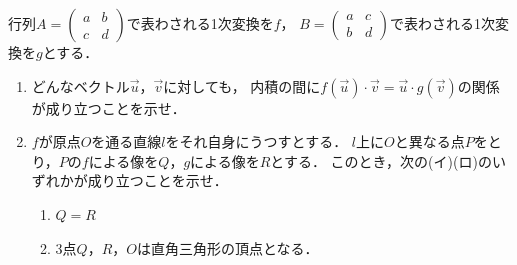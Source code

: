 \documentclass[../../main.tex]{subfiles}
\begin{document}
行列$A=
\begin{pmatrix} a & b \\ c & d
\end{pmatrix}$で表わされる1次変換を$f$，
$B=
\begin{pmatrix} a & c \\ b & d
\end{pmatrix}$で表わされる1次変換を$g$とする．
\begin{enumerate}
  \item どんなベクトル$\vec{u}$，$\vec{v}$に対しても，
    内積の間に$f(\vec{u})\cdot\vec{v}=\vec{u}\cdot g(\vec{v})$の関係が成り立つことを示せ．
  \item $f$が原点$O$を通る直線$l$をそれ自身にうつすとする．
    $l$上に$O$と異なる点$P$をとり，$P$の$f$による像を$Q$，$g$による像を$R$とする．
    このとき，次の(イ)(ロ)のいずれかが成り立つことを示せ．
    \begin{enumerate}
      \item[(イ)] $Q=R$
      \item[(ロ)] 3点$Q$，$R$，$O$は直角三角形の頂点となる．
    \end{enumerate}
\end{enumerate}
\end{document}
